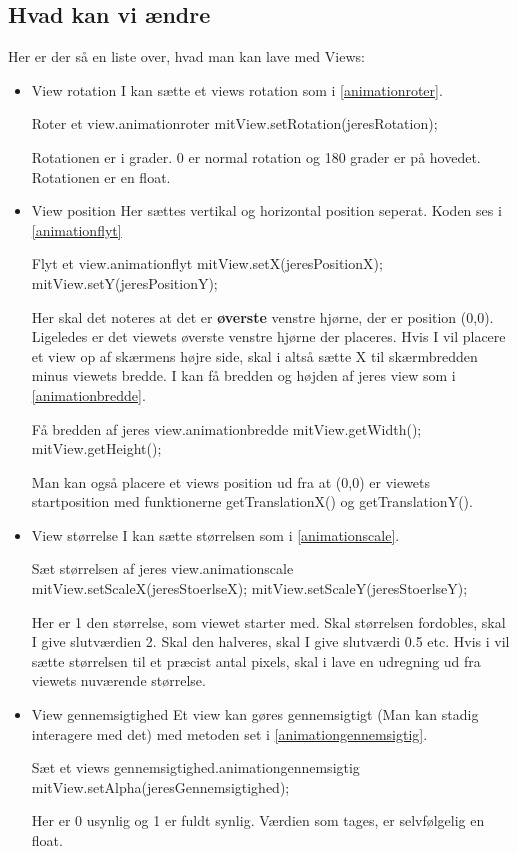 \subsection{Hvad kan vi ændre}
Her er der så en liste over, hvad man kan lave med Views:\\
\begin{itemize}
	\item View rotation
	I kan sætte et views rotation som i \autoref{animationroter}.
	\begin{JavaCode}{Roter et view.}{animationroter}
		mitView.setRotation(jeresRotation);
	\end{JavaCode}
	Rotationen er i grader. 0 er normal rotation og 180 grader er på hovedet. Rotationen er en float. 
	\\
	\item View position
	Her sættes vertikal og horizontal position seperat. Koden ses i \autoref{animationflyt}
	\begin{JavaCode}{Flyt et view.}{animationflyt}
		mitView.setX(jeresPositionX);
		mitView.setY(jeresPositionY);
	\end{JavaCode}
	Her skal det noteres at det er \textbf{øverste} venstre hjørne, der er position (0,0). Ligeledes er det viewets øverste venstre hjørne der placeres. Hvis I vil placere et view op af skærmens højre side, skal i altså sætte X til skærmbredden minus viewets bredde. I kan få bredden og højden af jeres view som i \autoref{animationbredde}.
	\begin{JavaCode}{Få bredden af jeres view.}{animationbredde}
		mitView.getWidth();
		mitView.getHeight();
	\end{JavaCode}
	Man kan også placere et views position ud fra at (0,0) er viewets startposition med funktionerne getTranslationX() og getTranslationY().
	\item View størrelse
	I kan sætte størrelsen som i \autoref{animationscale}.
	\begin{JavaCode}{Sæt størrelsen af jeres view.}{animationscale}
		mitView.setScaleX(jeresStoerlseX);
		mitView.setScaleY(jeresStoerlseY);
	\end{JavaCode}
	Her er 1 den størrelse, som viewet starter med. Skal størrelsen fordobles, skal I give slutværdien 2. Skal den halveres, skal I give slutværdi 0.5 etc. Hvis i vil sætte størrelsen til et præcist antal pixels, skal i lave en udregning ud fra viewets nuværende størrelse. \\
	\item View gennemsigtighed
	Et view kan gøres gennemsigtigt (Man kan stadig interagere med det) med metoden set i \autoref{animationgennemsigtig}.
	\begin{JavaCode}{Sæt et views gennemsigtighed.}{animationgennemsigtig}
		mitView.setAlpha(jeresGennemsigtighed);
	\end{JavaCode}
	Her er 0 usynlig og 1 er fuldt synlig. Værdien som tages, er selvfølgelig en float.
\end{itemize}
